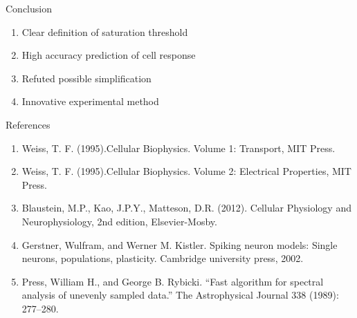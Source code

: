 \documentclass{beamer}
\begin{document}
\begin{frame}{Conclusion}
  \begin{enumerate}
    \item Clear definition of saturation threshold
    \item High accuracy prediction of cell response
    \item Refuted possible simplification
    \item Innovative experimental method
  \end{enumerate}
\end{frame}

\begin{frame}{References}
\begin{enumerate}
\item Weiss, T. F. (1995).Cellular Biophysics. Volume 1: Transport, MIT Press.
\item Weiss, T. F. (1995).Cellular Biophysics. Volume 2: Electrical Properties, MIT Press.
\item Blaustein, M.P., Kao, J.P.Y., Matteson, D.R. (2012). Cellular Physiology and Neurophysiology, 2nd edition, Elsevier-Mosby.
\item Gerstner, Wulfram, and Werner M. Kistler. Spiking neuron models: Single neurons, populations, plasticity. Cambridge university press, 2002.
\item Press, William H., and George B. Rybicki. ``Fast algorithm for spectral analysis of unevenly sampled data.'' The Astrophysical Journal 338 (1989): 277--280.
\end{enumerate}
\end{frame}
\end{document}
